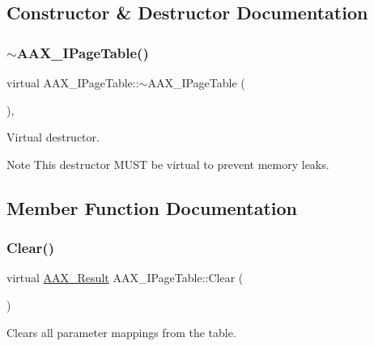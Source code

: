 \subsection{Constructor \& Destructor Documentation}
\mbox{\label{a01849_a5613c827997f9671abef60a591607ee8}} 
\subsubsection{\texorpdfstring{$\sim$AAX\_IPageTable()}{~AAX\_IPageTable()}}
{\footnotesize\ttfamily virtual A\+A\+X\+\_\+\+I\+Page\+Table\+::$\sim$\+A\+A\+X\+\_\+\+I\+Page\+Table (\begin{DoxyParamCaption}{ }\end{DoxyParamCaption})\hspace{0.3cm}{\ttfamily [inline]}, {\ttfamily [virtual]}}



Virtual destructor. 

\begin{DoxyNote}{Note}
This destructor M\+U\+ST be virtual to prevent memory leaks. 
\end{DoxyNote}


\subsection{Member Function Documentation}
\mbox{\label{a01849_a00a902ce17c43ae32947dba6088936d2}} 
\subsubsection{\texorpdfstring{Clear()}{Clear()}}
{\footnotesize\ttfamily virtual \mbox{\hyperlink{a00392_a4d8f69a697df7f70c3a8e9b8ee130d2f}{A\+A\+X\+\_\+\+Result}} A\+A\+X\+\_\+\+I\+Page\+Table\+::\+Clear (\begin{DoxyParamCaption}{ }\end{DoxyParamCaption})\hspace{0.3cm}{\ttfamily [pure virtual]}}



Clears all parameter mappings from the table. 


